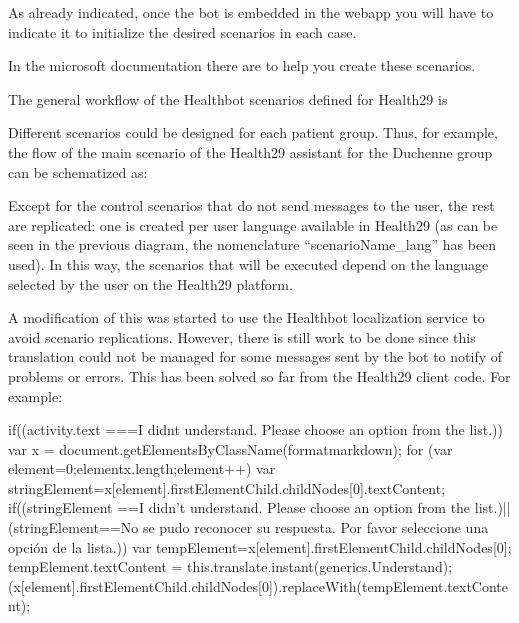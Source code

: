 \documentclass[letterpaper,10pt,english]{sphinxmanual}
\begin{document}
As already indicated, once the bot is embedded in the webapp you will have to indicate it to initialize the desired scenarios in each case.

In the microsoft documentation there are  to help you create these scenarios.

The general workflow of the Healthbot scenarios defined for Health29 is



Different scenarios could be designed for each patient group. Thus, for example, the flow of the main scenario of the Health29 assistant for the Duchenne group can be schematized as:



Except for the control scenarios that do not send messages to the user, the rest are replicated: one is created per user language available in Health29 (as can be seen in the previous diagram, the nomenclature “scenarioName\_lang” has been used).
In this way, the scenarios that will be executed depend on the language selected by the user on the Health29 platform.

A modification of this was started to use the Healthbot localization service to avoid scenario replications. However, there is still work to be done since this translation could not be managed for some messages sent by the bot to notify of problems or errors. This has been solved so far from the Health29 client code.
For example:

\begin{sphinxVerbatim}[commandchars=\\\{\}]
 if((activity.text ===\PYGZdq{}I didn\PYGZsq{}t understand. Please choose an option from the list.\PYGZdq{}))\PYGZob{}
  var x = document.getElementsByClassName(\PYGZdq{}format\PYGZhy{}markdown\PYGZdq{});
  for (var element=0;element\PYGZlt{}x.length;element++)\PYGZob{}
    var stringElement=x[element].firstElementChild.childNodes[0].textContent;
    if((stringElement ==\PYGZdq{}I didn’t understand. Please choose an option from the list.\PYGZdq{})||
    (stringElement==\PYGZdq{}No se pudo reconocer su respuesta. Por favor seleccione una opción de la lista.\PYGZdq{}))\PYGZob{}
      var tempElement=x[element].firstElementChild.childNodes[0];
      tempElement.textContent = this.translate.instant(\PYGZdq{}generics.Understand\PYGZdq{});
      \PYGZdl{}(x[element].firstElementChild.childNodes[0]).replaceWith(tempElement.textContent);
    \PYGZcb{}
  \PYGZcb{}
\end{sphinxVerbatim}
\end{document}
